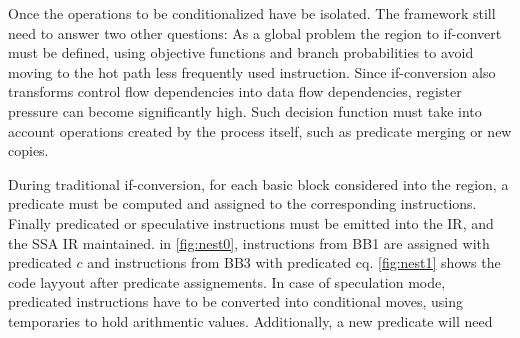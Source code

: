 Once the operations to be conditionalized have be isolated. The framework still need to answer two other questions: As a global problem the region to if-convert must be defined, using objective functions and branch probabilities to avoid moving to the hot path less frequently used instruction. Since if-conversion also transforms control flow dependencies into data flow dependencies, register pressure can become significantly high. Such decision function must take into account operations created by the process itself, such as predicate merging or new copies. 

During traditional if-conversion, for each basic block considered into the region, a predicate must be computed and assigned to the corresponding instructions. Finally predicated or speculative instructions must be emitted into the IR, and the SSA IR maintained. in \ref{fig:nest0}, instructions from BB1 are assigned with predicated $c$ and instructions from BB3 with predicated cq. \ref{fig:nest1} shows the code layyout after predicate assignements. In case of speculation mode, predicated instructions have to be converted into conditional moves, using temporaries to hold arithmentic values. Additionally, a new predicate will need 

